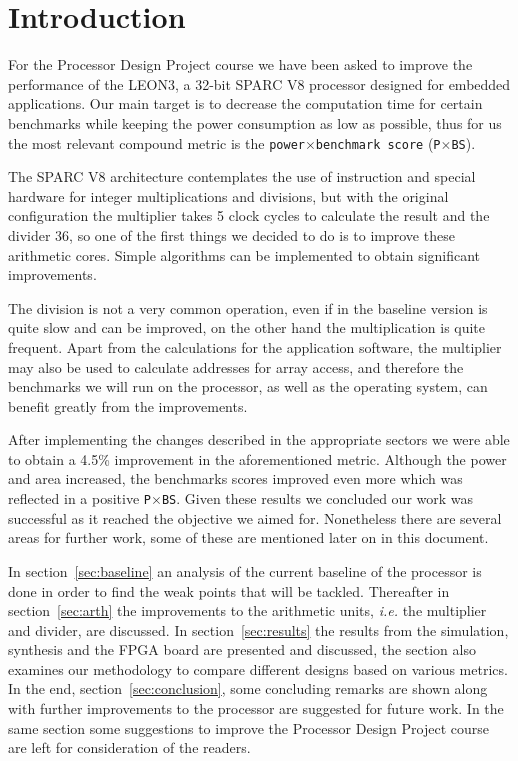 
\section{Introduction}

For the Processor Design Project course we have been asked to improve the performance of the
LEON3, a 32-bit SPARC V8 processor designed for embedded applications.
Our main target is to decrease the computation time for certain benchmarks while keeping the power
consumption as low as possible, thus for us the most relevant compound metric is the
\texttt{power}$\times$\texttt{benchmark score} (\texttt{P}$\times$\texttt{BS}).

The SPARC V8 architecture contemplates the use of instruction and special hardware for integer
multiplications and divisions, but with the original configuration the multiplier takes 5 clock cycles
to calculate the result and the divider 36, so one of the first things we decided to do is to improve
these arithmetic cores. Simple algorithms can be implemented to obtain significant improvements.

The division is not a very common operation, even if in the baseline version is quite slow and can be improved, on the other hand the multiplication is quite frequent. Apart from the calculations for the application software, the multiplier may also be used to calculate addresses for array access, and therefore the benchmarks we will run on the processor, as well as the operating system, can benefit greatly from the improvements.

After implementing the changes described in the appropriate sectors we were able to obtain a 4.5\% improvement in the aforementioned metric. Although the power and area increased, the benchmarks scores improved even more which was reflected in a positive \texttt{P$\times$BS}.
Given these results we concluded our work was successful as it reached the objective we aimed for. Nonetheless there are several areas for further work, some of these are mentioned later on in this document.


In section~\ref{sec:baseline} an analysis of the current baseline of the processor is done in order to find the weak points that will be tackled.
Thereafter in section~\ref{sec:arth} the improvements to the arithmetic units, \emph{i.e.} the multiplier and divider, are discussed.
In section~\ref{sec:results} the results from the simulation, synthesis and the FPGA board are presented and discussed, the section also examines our methodology to compare different designs based on various metrics.
In the end, section~\ref{sec:conclusion}, some concluding remarks are shown along with further improvements to the processor are suggested for future work. In the same section some suggestions to improve the Processor Design Project course are left for consideration of the readers.